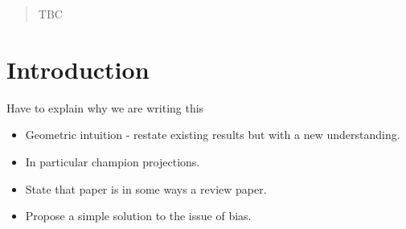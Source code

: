 \documentclass[12pt]{article}
\theoremstyle{definition}
\theoremstyle{property}
\begin{document}
	\bigskip
	
	
	\begin{abstract} TBC
	\end{abstract}
	
	
	\newpage
	
	\section{Introduction}\label{sec:intro}
	
	Have to explain why we are writing this
	\begin{itemize}
		\item Geometric intuition - restate existing results but with a new understanding.
		\item In particular champion projections.
		\item State that paper is in some ways a review paper.
		\item Propose a simple solution to the issue of bias.
	\end{itemize}
	
\end{document}
